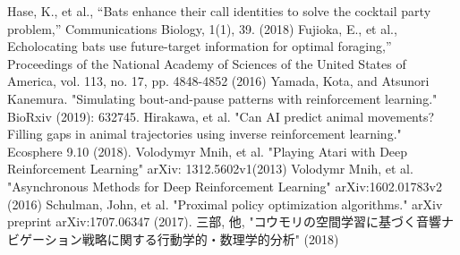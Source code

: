 \documentclass[../main]{subfiles}
\begin{document}
\begin{thebibliography}{99}
    Hase, K., et al., “Bats enhance their call identities to solve the cocktail party problem,” Communications Biology, 1(1), 39. (2018)
    Fujioka, E., et al., Echolocating bats use future-target information for optimal foraging,” Proceedings of the National Academy of Sciences of the United States of America, vol. 113, no. 17, pp. 4848-4852 (2016)
    Yamada, Kota, and Atsunori Kanemura. "Simulating bout-and-pause patterns with reinforcement learning." BioRxiv (2019): 632745.
    Hirakawa, et al. "Can AI predict animal movements? Filling gaps in animal trajectories using inverse reinforcement learning." Ecosphere 9.10 (2018).
    Volodymyr Mnih, et al. "Playing Atari with Deep Reinforcement Learning" arXiv: 1312.5602v1(2013)
   Volodymr Mnih, et al. "Asynchronous Methods for Deep Reinforcement Learning" arXiv:1602.01783v2 (2016)
    Schulman, John, et al. "Proximal policy optimization algorithms." arXiv preprint arXiv:1707.06347 (2017).
   三部, 他, "コウモリの空間学習に基づく音響ナビゲーション戦略に関する行動学的・数理学的分析" (2018)
\end{thebibliography}
\end{document}
